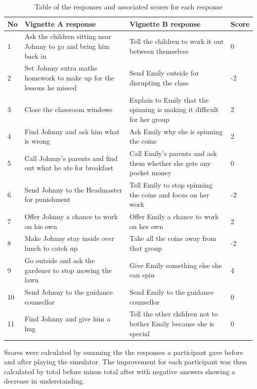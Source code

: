 \documentclass[11pt]{report}
\begin{document}
\begin{table}[H]
    \begin{tabular}{ | p{1cm} | p{6cm} | p{6cm} | p{1cm} |}
    \hline
    No & \textbf{Vignette A response} & \textbf{Vignette B response} & \textbf{Score} \\                                                                                                                                                                                    
	\hline
	1 & Ask the children sitting near Johnny to go and bring him back in & Tell the children to work it out between themselves & 0 \\ \hline
 	2 & Set Johnny extra maths homework to make up for the lessons he missed & Send Emily outside for disrupting the class & -2 \\ \hline
 	3 & Close the classroom windows & Explain to Emily that the spinning is making it difficult for her group & 2 \\ \hline
	4 & Find Johnny and ask him what is wrong & Ask Emily why she is spinning the coins & 2 \\ \hline
	5 & Call Johnny's parents and find out what he ate for breakfast & 	Call Emily's parents and ask them whether she gets any pocket money & 0 \\ \hline
	6 & Send Johnny to the Headmaster for punishment & Tell Emily to stop spinning the coins and focus on her work & -2 \\ \hline
	7 & Offer Johnny a chance to work on his own & 	Offer Emily a chance to work on her own & 2 \\ \hline
	8 & Make Johnny stay inside over lunch to catch up & Take all the coins away from that group &  -2 \\ \hline
	9 & Go outside and ask the gardener to stop mowing the lawn & Give Emily something else she can spin & 4 \\ \hline
	10 & Send Johnny to the guidance counsellor & Send Emily to the guidance counsellor &  0 \\ \hline
	11 & Find Johnny and give him a hug & Tell the other children not to bother Emily because she is special & 0 \\ 
    \hline
    \end{tabular}
    \label{response_scores}
    \caption{Table of the responses and associated scores for each response}
\end{table}

Scores were calculated by summing the the responses a participant gave before and after playing the simulator. The improvement for each participant was then calculated by total before minus total after with negative answers showing a decrease in understanding.
\end{document}
